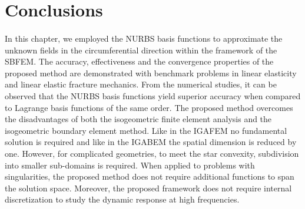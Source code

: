 













\section{Conclusions}
\paragraph{}
In this chapter, we employed the NURBS basis functions to approximate the unknown fields in the circumferential direction within the framework of the SBFEM.
The accuracy, effectiveness and the convergence properties of the proposed method are demonstrated with benchmark problems in linear elasticity and linear elastic fracture mechanics.
From the numerical studies, it can be observed that the NURBS basis functions yield superior accuracy when compared to Lagrange basis functions of the same order.
The proposed method overcomes the disadvantages of both the isogeometric finite element analysis and the isogeometric boundary element method. 
Like in the IGAFEM no fundamental solution is required and like in the IGABEM the spatial dimension is reduced by one.
However, for complicated geometries, to meet the star convexity, subdivision into smaller sub-domains is required.
When applied to problems with singularities, the proposed method does not require additional functions to span the solution space.
Moreover, the proposed framework does not require internal discretization to study the dynamic response at high frequencies.
\pagebreak